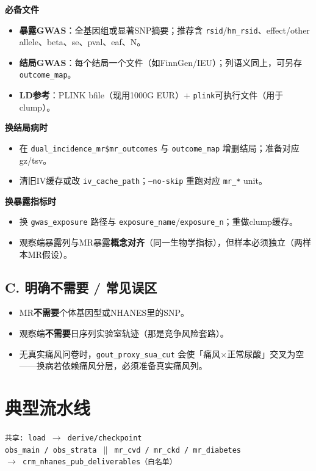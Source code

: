 \documentclass[11pt,a4paper]{article}
\begin{document}
\textbf{必备文件}
\begin{itemize}
  \item \textbf{暴露GWAS}：全基因组或显著SNP摘要；推荐含 \texttt{rsid}/\texttt{hm\_rsid}、effect/other allele、beta、se、pval、eaf、N。
  \item \textbf{结局GWAS}：每个结局一个文件（如FinnGen/IEU）；列语义同上，可另存\texttt{outcome\_map}。
  \item \textbf{LD参考}：PLINK bfile（现用1000G EUR）+ \texttt{plink}可执行文件（用于clump）。
\end{itemize}

\textbf{换结局病时}
\begin{itemize}
  \item 在 \texttt{dual\_incidence\_mr\$mr\_outcomes} 与 \texttt{outcome\_map} 增删结局；准备对应gz/tsv。
  \item 清旧IV缓存或改 \texttt{iv\_cache\_path}；\texttt{--no-skip} 重跑对应 \texttt{mr\_*} unit。
\end{itemize}

\textbf{换暴露指标时}
\begin{itemize}
  \item 换 \texttt{gwas\_exposure} 路径与 \texttt{exposure\_name}/\texttt{exposure\_n}；重做clump缓存。
  \item 观察端暴露列与MR暴露\textbf{概念对齐}（同一生物学指标），但样本必须独立（两样本MR假设）。
\end{itemize}

\subsection{C. 明确不需要 / 常见误区}
\begin{itemize}
  \item MR\textbf{不需要}个体基因型或NHANES里的SNP。
  \item 观察端\textbf{不需要}日序列实验室轨迹（那是竞争风险套路）。
  \item 无真实痛风问卷时，\texttt{gout\_proxy\_sua\_cut} 会使「痛风$\times$正常尿酸」交叉为空——换病若依赖痛风分层，必须准备真实痛风列。
\end{itemize}

\section{典型流水线}

\begin{center}
\small
\texttt{共享: load $\rightarrow$ derive/checkpoint}\\[0.3em]
\texttt{obs\_main / obs\_strata $\parallel$ mr\_cvd / mr\_ckd / mr\_diabetes}\\[0.3em]
\texttt{$\rightarrow$ crm\_nhanes\_pub\_deliverables（白名单）}
\end{center}
\end{document}
